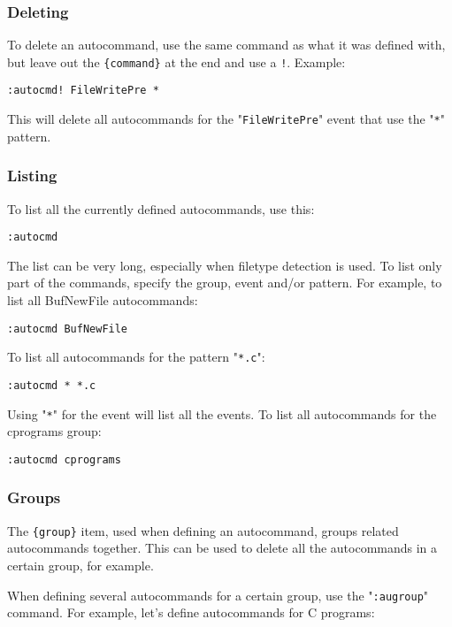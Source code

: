 \subsubsection{Deleting}
To delete an autocommand, use the same command as what it was defined with, but leave out the \verb!{command}! at the end and use a \verb;!;.
Example:

\begin{Verbatim}[samepage=true]
 :autocmd! FileWritePre *
\end{Verbatim}

This will delete all autocommands for the "\verb!FileWritePre!" event that use the "\verb!*!" pattern.
\subsubsection{Listing}
To list all the currently defined autocommands, use this:

\begin{Verbatim}[samepage=true]
 :autocmd
\end{Verbatim}

The list can be very long, especially when filetype detection is used.
To list only part of the commands, specify the group, event and/or pattern.
For example, to list all BufNewFile autocommands:

\begin{Verbatim}[samepage=true]
 :autocmd BufNewFile
\end{Verbatim}

To list all autocommands for the pattern "\verb!*.c!":

\begin{Verbatim}[samepage=true]
 :autocmd * *.c
\end{Verbatim}

Using "\verb!*!" for the event will list all the events.
To list all autocommands for the cprograms group:

\begin{Verbatim}[samepage=true]
 :autocmd cprograms
\end{Verbatim}

\subsubsection{Groups}
The \verb!{group}! item, used when defining an autocommand, groups related autocommands together.
This can be used to delete all the autocommands in a certain group, for example.

When defining several autocommands for a certain group, use the "\verb!:augroup!" command.
For example, let's define autocommands for C programs:

